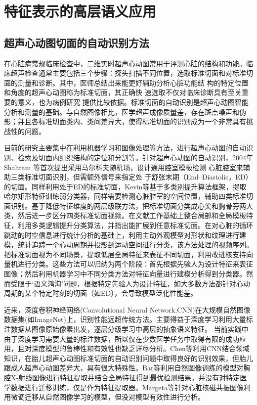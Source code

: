 \chapter{特征表示的高层语义应用}
\label{chap:classification}

\section{超声心动图切面的自动识别方法}
在心脏病常规临床检查中，二维实时超声心动图常用于评测心脏的结构和功能。临床超声检查通常主要包括三个步骤：探头扫描不同位置，选取标准切面和对标准切面的测量和诊断\citep{Chen2015}。其中，医师总结出来能更好辅助分析心脏功能结 构的特定位置和角度的超声心动图称为标准切面，其正确快 速选取不仅对临床诊断具有至关重要的意义，也为病例研究 提供比较依据。标准切面的自动识别是超声心动图智能分析和测量的基础。与自然图像相比，医学超声成像质量差，存在斑点噪声和伪影；并且各标准切面类内、类间差异大，使得标准切面的识别成为一个非常具有挑战性的问题。

目前的研究主要集中在利用机器学习和图像处理等方法，进行超声心动图的自动识别、检索及切面内组织结构的定位和分割等。针对超声心动图的自动识别，2004年Shahram 等\citep{Ebadollahi2004}首次提出采用马尔科夫随机场，设计通用腔室模板检测 心脏腔室来辅助三类标准切面识别，但需额外信号来指定处 于舒张末期（End–Diastolic，ED）的切面。同样利用处于ED的标准切面，Kevin等\citep{KevinZhou2006}基于多类别提升算法框架，提取哈尔矩形特征训练弱分类器，同样需要检测心脏腔室的空间位置，辅助四类标准切面识别。基于降低特征维度的两层级联方法，把标准切面分类成心尖和胸骨旁两大类，然后进一步区分四类标准切面视频\citep{Otey2006,Roy2006b}。在文献工作基础上整合局部和全局模板特征，利用多类逻辑提升分类算法，并指出能扩展到任意标准切面\citep{Park2007a}。在对心脏的循环跳动的时空信息进行统计分析的基础上，利用主动外观模型对形状和纹理进行建模，统计追踪一个心动周期并投影到运动空间进行分类\citep{Beymer2008}，该方法处理的视频序列。把标准切面视为不同场景，提取低层全局特征来表征不同切面，利用改进核支持向量机进行分类\citep{Wu2014c}。这些方法可以归纳为两个阶段：首先根据先验人为设计特征来表征图像；然后利用机器学习中不同分类方法对特征向量进行建模分析得到分类器。然而受限于‘语义鸿沟’问题，根据特定先验人为设计特征，如大多数方法都针对心动周期的某个特定时刻的切面（如ED），会导致模型泛化性能差。

近来，深度卷积神经网络(Convolutional Neural Network,CNN)在大规模自然图像数据集(如ImageNet\citep{Deng2009ImageNet})上，识别性能远超传统方法\citep{Krizhevsky2012}。主要得益于深度学习利用大量标注数据从图像原始像素出发，逐层分级学习中高层的抽象语义特征\citep{Sharif2014}。
当前实践中由于深度学习需要大量的标注数据，所以仅在少数医学任务中取得有限的成功应用，且对深度模型的鲁棒性和有效性也缺乏详尽分析。Chen等\citep{Chen2015}利用CNN结合领域知识，在胎儿超声心动图标准切面的自动识别问题中取得良好的识别效果，但胎儿跟成人超声心动图差异大，具有很大特殊性。Bar等\citep{Bar2015Chest}利用自然图像训练的模型对胸腔X-射线图像进行特征提取并结合全局特征\citep{Oliva2001}得到最优检测结果，并没有对特定医学数据进行迁移训练，仅是作为特征提取器。Margeta等\citep{Margeta2015}针对心脏核磁共振图像利用微调迁移从自然图像学习的模型，但没对模型有效性进行分析。


